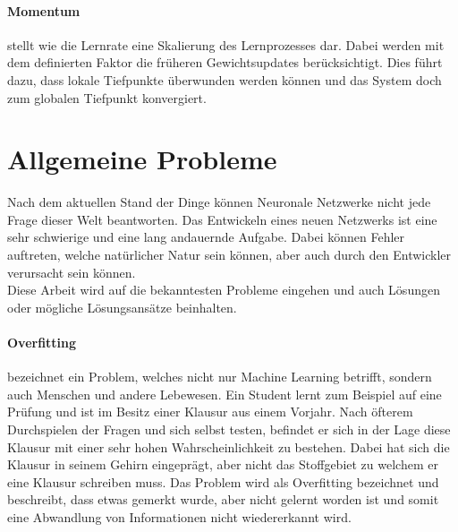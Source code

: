 \paragraph{Momentum} stellt wie die Lernrate eine Skalierung des Lernprozesses dar.
Dabei werden mit dem definierten Faktor die früheren Gewichtsupdates berücksichtigt. 
Dies führt dazu, dass lokale Tiefpunkte überwunden werden können und das System doch zum globalen Tiefpunkt konvergiert.

\section{Allgemeine Probleme}
\label{sec:AllgeProb}

Nach dem aktuellen Stand der Dinge können Neuronale Netzwerke nicht jede Frage dieser Welt beantworten.
Das Entwickeln eines neuen Netzwerks ist eine sehr schwierige und eine lang andauernde Aufgabe. 
Dabei können Fehler auftreten, welche natürlicher Natur sein können, aber auch durch den Entwickler verursacht sein können. \\


\noindent
Diese Arbeit wird auf die bekanntesten Probleme eingehen und auch Lösungen oder mögliche Lösungsansätze beinhalten. 


\paragraph{Overfitting} bezeichnet ein Problem, welches nicht nur Machine Learning betrifft, sondern auch Menschen und andere Lebewesen. 
Ein Student lernt zum Beispiel auf eine Prüfung und ist im Besitz einer Klausur aus einem Vorjahr. 
Nach öfterem Durchspielen der Fragen und sich selbst testen, befindet er sich in der Lage diese Klausur mit einer sehr hohen Wahrscheinlichkeit zu bestehen. 
Dabei hat sich die Klausur in seinem Gehirn eingeprägt, aber nicht das Stoffgebiet zu welchem er eine Klausur schreiben muss. 
Das Problem wird als Overfitting bezeichnet und beschreibt, dass etwas gemerkt wurde, aber nicht gelernt worden ist und somit eine Abwandlung von Informationen nicht wiedererkannt wird.

